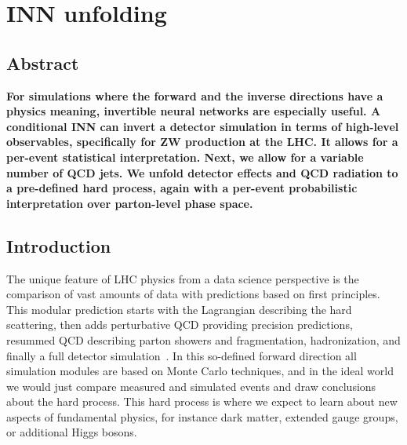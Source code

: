 %
%
%

\chapter{INN unfolding}\label{chap:inn}
\enlargethispage{2ex}
\vspace*{-2pt}

\enlargethispage{2ex}

\section*{Abstract}
{\bf For simulations where the forward and the inverse directions have a physics meaning, invertible neural networks are especially useful. A conditional INN can invert a detector simulation in terms of high-level observables, specifically for ZW production at the LHC. It allows for a per-event statistical interpretation. Next, we allow for a variable number of QCD jets. We unfold detector effects and QCD radiation to a pre-defined hard process, again with a per-event probabilistic interpretation over parton-level phase space.}

\section{Introduction}
\label{sec:innintro}

The unique feature of LHC physics from a data science perspective is
the comparison of vast amounts of data with predictions based on first
principles. This modular prediction starts with the Lagrangian
describing the hard scattering, then adds perturbative QCD providing
precision predictions, resummed QCD describing parton showers and
fragmentation, hadronization, and finally a full detector
simulation~\cite{black_book}. In this so-defined forward direction all
simulation modules are based on Monte Carlo techniques, and in the
ideal world we would just compare measured and simulated events and
draw conclusions about the hard process. This hard process is where we
expect to learn about new aspects of fundamental physics, for instance
dark matter, extended gauge groups, or additional Higgs bosons.

